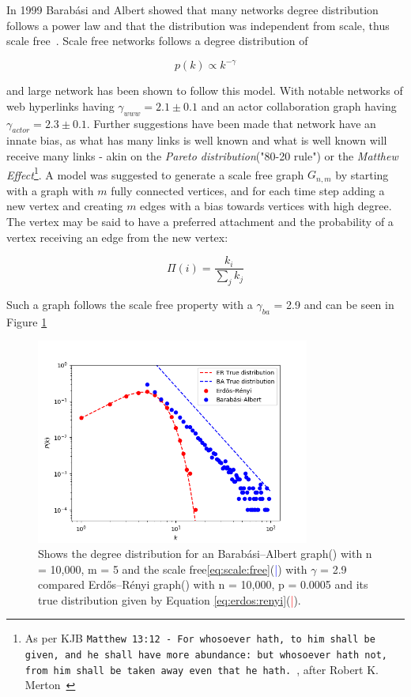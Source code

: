 In 1999 Barabási and Albert showed that many networks degree distribution follows a power law and that the distribution was independent from scale, thus scale free~\cite{barabasi:albert:emergent:scaling}. Scale free networks follows a degree distribution of

\begin{equation}
	 p(k) \propto k^{-\gamma} 
	\label{eq:scale:free}
\end{equation}

and large network has been shown to follow this model. With notable networks of web hyperlinks having $\gamma_{www} = 2.1\pm 0.1$ and an actor collaboration graph having $\gamma_{actor} = 2.3\pm0.1$. Further suggestions have been made that network have an innate bias, as what has many links is well known and what is well known will receive many links - akin on the \textit{Pareto distribution}("80-20 rule") or the \textit{Matthew Effect}\footnote{As per KJB \texttt{Matthew 13:12 - For whosoever hath, to him shall be given, and he shall have more abundance: but whosoever hath not, from him shall be taken away even that he hath.}~\cite{king:james:bible}, after Robert K. Merton~\cite{merton:matthew:effect} }. 
A model was suggested to generate a scale free graph $G_{n, m}$ by starting with a graph with $m$ fully connected vertices, and for each time step adding a new vertex and creating $m$ edges with a bias towards vertices with high degree. The vertex may be said to have a preferred attachment and the probability of a vertex receiving an edge from the new vertex:

\[ \Pi(i) = \dfrac{k_i}{\sum_{j}^{}k_j}  \]

Such a graph follows the scale free property with a $\gamma_{ba}$ = 2.9 and can be seen in Figure \ref{fig:scale_free}
\newpage
\begin{figure}[!htb]
	\hspace*{-0.5cm} 
	\centering
	\includegraphics[width=9cm]{images/scale_free_degree_distribution.png}
	\caption{Shows the degree distribution for an Barabási–Albert graph(\tikzcircle[blue, fill=blue]{2pt}) with n = 10,000, m = 5 and the scale free\ref{eq:scale:free}(\textcolor{blue}{|}) with $\gamma$ = 2.9 compared Erdős–Rényi graph(\tikzcircle[red, fill=red]{2pt}) with n = 10,000, p = 0.0005 and its true distribution given by Equation \ref{eq:erdos:renyi}(\textcolor{red}{|}).
	}
	\label{fig:scale_free}
	\hspace*{2mm} 
\end{figure}

